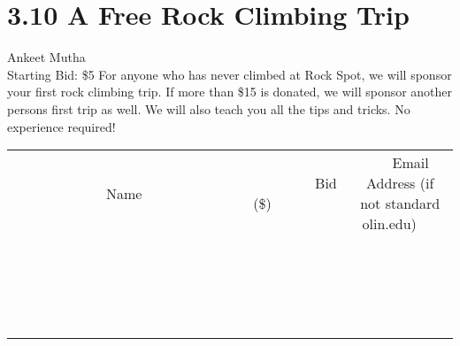 \documentclass[11pt]{article}
\begin{document}
\section*{3.10 A Free Rock Climbing Trip}
Ankeet Mutha
\\
Starting Bid: \$5
\newline
For anyone who has never climbed at Rock Spot, we will sponsor your first rock climbing trip. If more than \$15 is donated, we will sponsor another persons first trip as well. We will also teach you all the tips and tricks. No experience required!
\\[3ex]
\begin{tabular}{c c c}
~~~~~~~~~~~~~Name~~~~~~~~~~~~~ & ~~~~~~~~~Bid (\$)~~~~~~~~~  & ~~~Email Address (if not standard olin.edu)~~~\\
 & & \\
\hline
 & & \\
\hline
 & & \\
\hline
 & & \\
\hline
 & & \\
\hline
 & & \\
\hline
 & & \\
\hline
 & & \\
\hline
 & & \\
\hline
 & & \\
\hline
 & & \\
\hline
 & & \\
\hline
 & & \\
\hline
 & & \\
\hline
 & & \\
\hline
 & & \\
\hline
 & & \\
\hline
 & & \\
\hline
 & & \\
\hline
\end{tabular}
\newpage
\end{document}
